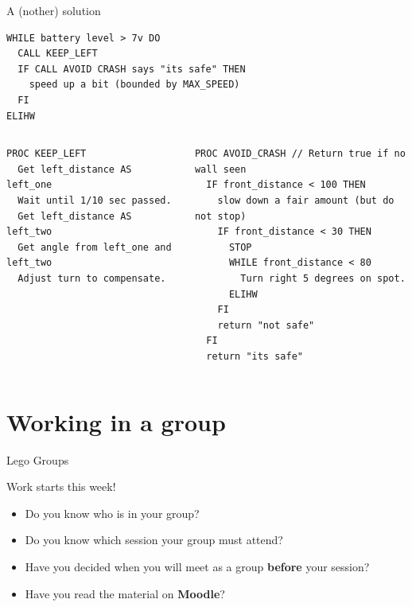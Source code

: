 \documentclass[color=pdftex,usenames,dvipsnames, aspectratio=169]{beamer}
\begin{document}
\begin{frame}[fragile=singleslide]{A (nother) solution}
\vspace*{-2mm}
\begin{lstlisting}[basicstyle=\ttfamily\scriptsize\color{blue}, linewidth=10cm,emph={CALL,DO,OD,IF,FI,WHILE,ELIHW,THEN}]
WHILE battery level > 7v DO
  CALL KEEP_LEFT
  IF CALL AVOID CRASH says "its safe" THEN
    speed up a bit (bounded by MAX_SPEED)
  FI
ELIHW
\end{lstlisting}
\vspace*{-3mm}
\begin{columns}[T]
\begin{column}{0.4\textwidth}
\begin{lstlisting}[basicstyle=\ttfamily\scriptsize\color{blue}, linewidth=6.5cm,emph={PROC,AS}]
PROC KEEP_LEFT
  Get left_distance AS left_one
  Wait until 1/10 sec passed.
  Get left_distance AS left_two
  Get angle from left_one and left_two
  Adjust turn to compensate.
\end{lstlisting}
\end{column}
\begin{column}{0.55\textwidth}
\begin{lstlisting}[basicstyle=\ttfamily\scriptsize\color{blue}, linewidth=7.7cm,emph={CALL,DO,OD,IF,FI,WHILE,ELIHW,THEN}]
PROC AVOID_CRASH // Return true if no wall seen
  IF front_distance < 100 THEN
    slow down a fair amount (but do not stop)
    IF front_distance < 30 THEN
      STOP
      WHILE front_distance < 80
        Turn right 5 degrees on spot.
      ELIHW
    FI
    return "not safe"
  FI
  return "its safe"
\end{lstlisting}
\end{column}
\end{columns}
\end{frame}

\section{Working in a group}

\begin{frame}{Lego Groups}
\begin{block}{Work starts this week!}
\begin{itemize}
\item Do you know who is in your group?
\item Do you know which session your group must attend?
\item Have you decided when you will meet as a group \textbf{before} your session?
\item Have you read the material on {\bf Moodle}?
\end{itemize}
\end{block}
\end{frame}
\end{document}
